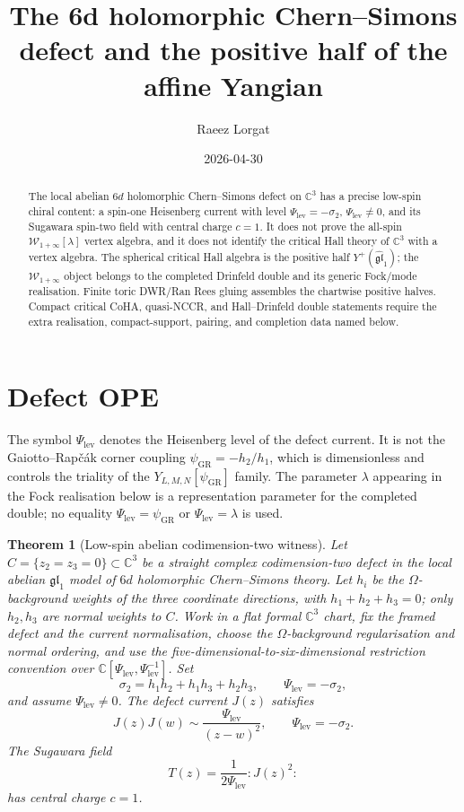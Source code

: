 \documentclass[11pt]{amsart}
\title[6d hCS and affine Yangian positive half]{The 6d holomorphic Chern--Simons defect and
the positive half of the affine Yangian}
\author{Raeez Lorgat}
\date{2026-04-30}
\providecommand{\bC}{\mathbb{C}}
\providecommand{\cW}{\mathcal{W}}
\newtheorem{theorem}{Theorem}
\theoremstyle{definition}
\theoremstyle{remark}
\begin{document}
\begin{abstract}
The local abelian \(6d\) holomorphic Chern--Simons defect on \(\bC^3\)
has a precise low-spin chiral content: a spin-one Heisenberg current with
level \(\Psi_{\mathrm{lev}}=-\sigma_2\), \(\Psi_{\mathrm{lev}}\neq0\),
and its Sugawara spin-two field with central charge \(c=1\). It does not
prove the all-spin \(\cW_{1+\infty}[\lambda]\) vertex algebra, and it does
not identify the critical Hall theory of \(\bC^3\) with a vertex algebra.
The spherical critical Hall algebra is the positive half
\(Y^+(\widehat{\mathfrak{gl}}_1)\); the \(\cW_{1+\infty}\) object belongs
to the completed Drinfeld double and its generic Fock/mode realisation.
Finite toric DWR/Ran Rees gluing assembles the chartwise positive halves.
Compact critical CoHA, quasi-NCCR, and Hall--Drinfeld double statements
require the extra realisation, compact-support, pairing, and completion
data named below.
\end{abstract}
\maketitle

\section{Defect OPE}

The symbol \(\Psi_{\mathrm{lev}}\) denotes the Heisenberg level of the
defect current. It is not the Gaiotto--Rap\v{c}\'ak corner coupling
\(\psi_{\mathrm{GR}}=-h_2/h_1\), which is dimensionless and controls the
triality of the \(Y_{L,M,N}[\psi_{\mathrm{GR}}]\) family. The parameter
\(\lambda\) appearing in the Fock realisation below is a representation
parameter for the completed double; no equality
\(\Psi_{\mathrm{lev}}=\psi_{\mathrm{GR}}\) or
\(\Psi_{\mathrm{lev}}=\lambda\) is used.

\begin{theorem}[Low-spin abelian codimension-two witness]
Let \(C=\{z_2=z_3=0\}\subset\bC^3\) be a straight complex
codimension-two defect in the local abelian \(\mathfrak{gl}_1\) model of
\(6d\) holomorphic Chern--Simons theory. Let \(h_i\) be the
\(\Omega\)-background weights of the three coordinate directions, with
\(h_1+h_2+h_3=0\); only \(h_2,h_3\) are normal weights to \(C\). Work in a
flat formal \(\bC^3\) chart, fix the framed defect and the current
normalisation, choose the \(\Omega\)-background regularisation and normal
ordering, and use the five-dimensional-to-six-dimensional restriction
convention over \(\bC[\Psi_{\mathrm{lev}},\Psi_{\mathrm{lev}}^{-1}]\). Set
\[
        \sigma_2=h_1h_2+h_1h_3+h_2h_3,\qquad
        \Psi_{\mathrm{lev}}=-\sigma_2,
\]
and assume \(\Psi_{\mathrm{lev}}\neq0\). The defect current \(J(z)\) satisfies
\[
        J(z)J(w)\sim \frac{\Psi_{\mathrm{lev}}}{(z-w)^2},
        \qquad \Psi_{\mathrm{lev}}=-\sigma_2 .
\]
The Sugawara field
\[
        T(z)=\frac{1}{2\Psi_{\mathrm{lev}}}:J(z)^2:
\]
has central charge \(c=1\).
\end{theorem}
\end{document}
